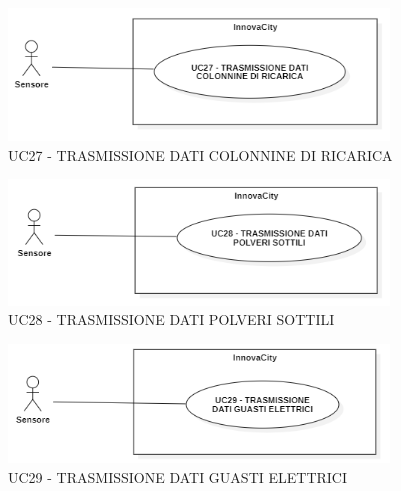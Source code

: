 
\begin{figure}[H]
    \centering
    \includegraphics[width=0.9\textwidth]{../Images/uc27.PNG}
    \caption{UC27 - TRASMISSIONE DATI COLONNINE DI RICARICA }
\end{figure}



\begin{figure}[H]
    \centering
    \includegraphics[width=0.9\textwidth]{../Images/uc28.PNG}
    \caption{UC28 - TRASMISSIONE DATI POLVERI SOTTILI }
\end{figure}



\begin{figure}[H]
    \centering
    \includegraphics[width=0.9\textwidth]{../Images/uc29.PNG}
    \caption{UC29 - TRASMISSIONE DATI GUASTI ELETTRICI }
\end{figure}


\setcounter{rowcounter}{1}

